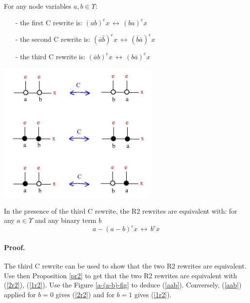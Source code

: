\documentclass{article}
\begin{document}
\begin{definition}
For any node variables $a,b \in \Upsilon$: 
\begin{enumerate}
\item[-] the first C rewrite is: $\displaystyle \left(a b \right)^{e} x \, \longleftrightarrow \, \left(b a  \right)^{e} x$
\item[-] the second C rewrite is: $\displaystyle \left(\bar{a} \bar{b} \right)^{e} x \, \longleftrightarrow \, \left(\bar{b} \bar{a}  \right)^{e} x$
\item[-] the third C rewrite is: $\displaystyle \left(\bar{a} b \right)^{e} x \, \longleftrightarrow \, \left(b \bar{a}  \right)^{e} x$
\end{enumerate}
\centerline{\includegraphics[width=80mm]{jpg/accept_3.jpg}}  
\label{c}
\end{definition}


\begin{proposition}
In the presence of the third C rewrite, the R2 rewrites are equivalent with: for any $a \in \Upsilon$ and any binary term $b$ 
\begin{equation}
 a - (a - b)^{e} x \, \longleftrightarrow \, b^{e} x 
\label{aab}
\end{equation}
\end{proposition}

\paragraph{Proof.} The third C rewrite can be used to show that the two R2 rewrites are equivalent. Use then Proposition \ref{pr2} to get that the two R2 rewrites are equivalent with 
(\ref{2r2}), (\ref{1r2}). Use the Figure \ref{a-(a-b)-fig} to deduce (\ref{aab}). Conversely, (\ref{aab}) applied for $b = 0$ gives (\ref{2r2}) and for $b = 1$ gives (\ref{1r2}). 
\end{document}
